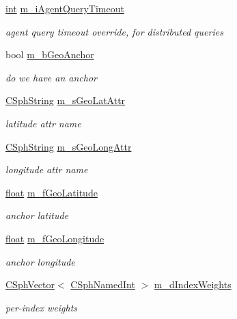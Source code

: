 \begin{DoxyCompactItemize}
\hyperlink{sphinxexpr_8cpp_a4a26e8f9cb8b736e0c4cbf4d16de985e}{int} \hyperlink{classCSphQuery_a501ee30c34993b5644a58f3cdc48ef6a}{m\-\_\-i\-Agent\-Query\-Timeout}
\begin{DoxyCompactList}\small\item\em agent query timeout override, for distributed queries \end{DoxyCompactList}\item 
bool \hyperlink{classCSphQuery_a6cac40b6180ec85cd7f535219fd50300}{m\-\_\-b\-Geo\-Anchor}
\begin{DoxyCompactList}\small\item\em do we have an anchor \end{DoxyCompactList}\item 
\hyperlink{structCSphString}{C\-Sph\-String} \hyperlink{classCSphQuery_a574047391f7256e1fa0355f358d86391}{m\-\_\-s\-Geo\-Lat\-Attr}
\begin{DoxyCompactList}\small\item\em latitude attr name \end{DoxyCompactList}\item 
\hyperlink{structCSphString}{C\-Sph\-String} \hyperlink{classCSphQuery_a30f3f434382a8160ab7536bbb760f418}{m\-\_\-s\-Geo\-Long\-Attr}
\begin{DoxyCompactList}\small\item\em longitude attr name \end{DoxyCompactList}\item 
\hyperlink{sphinxexpr_8cpp_a0e0d0739f7035f18f949c2db2c6759ec}{float} \hyperlink{classCSphQuery_a4b33b32f89324d816460e210e183ef6d}{m\-\_\-f\-Geo\-Latitude}
\begin{DoxyCompactList}\small\item\em anchor latitude \end{DoxyCompactList}\item 
\hyperlink{sphinxexpr_8cpp_a0e0d0739f7035f18f949c2db2c6759ec}{float} \hyperlink{classCSphQuery_a9f142b82596ebc0dec6b69edb9467ac9}{m\-\_\-f\-Geo\-Longitude}
\begin{DoxyCompactList}\small\item\em anchor longitude \end{DoxyCompactList}\item 
\hyperlink{classCSphVector}{C\-Sph\-Vector}$<$ \hyperlink{structCSphNamedInt}{C\-Sph\-Named\-Int} $>$ \hyperlink{classCSphQuery_a66895de5443f7850e52a65805b05be9b}{m\-\_\-d\-Index\-Weights}
\begin{DoxyCompactList}\small\item\em per-\/index weights \end{DoxyCompactList}\item 

\end{DoxyCompactItemize}
